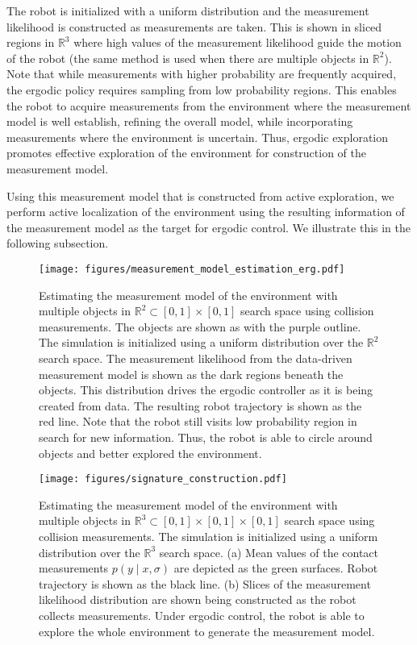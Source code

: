 \documentclass[conference]{IEEEtran}
\begin{document}
The robot is initialized with a uniform distribution and the measurement likelihood is constructed as measurements are taken.
This is shown in sliced regions in $\mathbb{R}^3$  where high values of the measurement likelihood guide the motion of the robot (the same method is used when there are multiple objects in $\mathbb{R}^2$). 
Note that while measurements with higher probability are frequently acquired, the ergodic policy requires sampling from low probability regions.
This enables the robot to acquire measurements from the environment where the measurement model is well establish, refining the overall model, while incorporating measurements where the environment is uncertain. 
Thus, ergodic exploration promotes effective exploration of the environment for construction of the measurement model. 

Using this measurement model that is constructed from active exploration, we perform active localization of the environment using the resulting information of the measurement model as the target for ergodic control.
We illustrate this in the following subsection.

\begin{figure}[ht!]
\centering
\texttt{[image: figures/measurement\_model\_estimation\_erg.pdf]}
\caption{
Estimating the measurement model of the environment with multiple objects in $\mathbb{R}^2 \subset \left[0,1 \right] \times \left[0,1 \right]$ search space using collision measurements. 
The objects are shown as with the purple outline. 
The simulation is initialized using a uniform distribution over the $\mathbb{R}^2$ search space.
The measurement likelihood from the data-driven measurement model is shown as the dark regions beneath the objects.
This distribution drives the ergodic controller as it is being created from data.
The resulting robot trajectory is shown as the red line.
Note that the robot still visits low probability region in search for new information.
Thus, the robot is able to circle around objects and better explored the environment.
} 
\label{fig:2Dobject_est}
\end{figure}

\begin{figure}[]
\centering
\texttt{[image: figures/signature\_construction.pdf]}
\caption{
Estimating the measurement model of the environment with multiple objects in $\mathbb{R}^3 \subset \left[0,1 \right] \times \left[0,1 \right] \times \left[0,1 \right]$ search space using collision measurements. 
The simulation is initialized using a uniform distribution over the $\mathbb{R}^3$ search space.
(a) Mean values of the contact measurements $p(y \mid x,\sigma)$ are depicted as the green surfaces. 
Robot trajectory is shown as the black line.
(b) Slices of the measurement likelihood distribution are shown being constructed as the robot collects measurements.
Under ergodic control, the robot is able to explore the whole environment to generate the measurement model.
} 
\label{fig:3Dtorus}
\end{figure}
\end{document}
